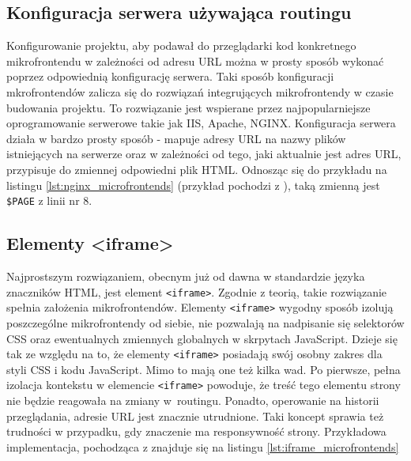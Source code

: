 \documentclass{SGGW-thesis}
\begin{document}
\subsection{Konfiguracja serwera używająca routingu}
Konfigurowanie projektu, aby podawał do przeglądarki kod konkretnego mikrofrontendu w zależności od adresu URL można w prosty sposób wykonać poprzez odpowiednią konfigurację serwera. Taki sposób konfiguracji mkrofrontendów zalicza się do rozwiązań integrujących mikrofrontendy w czasie budowania projektu. To rozwiązanie jest wspierane przez najpopularniejsze oprogramowanie serwerowe takie jak IIS, Apache, NGINX. Konfiguracja serwera działa w bardzo prosty sposób - mapuje adresy URL na nazwy plików istniejących na serwerze oraz w zależności od tego, jaki aktualnie jest adres URL, przypisuje do zmiennej odpowiedni plik HTML. Odnosząc się do przykładu na listingu \cref{lst:nginx_microfrontends} (przykład pochodzi z \cite{fowler_2019}), taką zmienną jest \lstinline{$PAGE} z linii nr 8.



\subsection{Elementy <iframe>}
Najprostszym rozwiązaniem, obecnym już od dawna w standardzie języka znaczników HTML, jest element \lstinline{<iframe>}. Zgodnie z teorią, takie rozwiązanie spełnia założenia mikrofrontendów. Elementy \lstinline{<iframe>} wygodny sposób izolują poszczególne mikrofrontendy od siebie, nie pozwalają na nadpisanie się selektorów CSS oraz ewentualnych zmiennych globalnych w skrpytach JavaScript. Dzieje się tak ze względu na to, że elementy \lstinline{<iframe>} posiadają swój osobny zakres dla styli CSS i kodu JavaScript. Mimo to mają one też kilka wad. Po pierwsze, pełna izolacja kontekstu w elemencie \lstinline{<iframe>} powoduje, że treść tego elementu strony nie będzie reagowała na zmiany w~routingu. Ponadto, operowanie na historii przeglądania, adresie URL jest znacznie utrudnione. Taki koncept sprawia też trudności w przypadku, gdy znaczenie ma responsywność strony. Przykładowa implementacja, pochodząca z \cite{fowler_2019} znajduje się na listingu \cref{lst:iframe_microfrontends}


\end{document}

